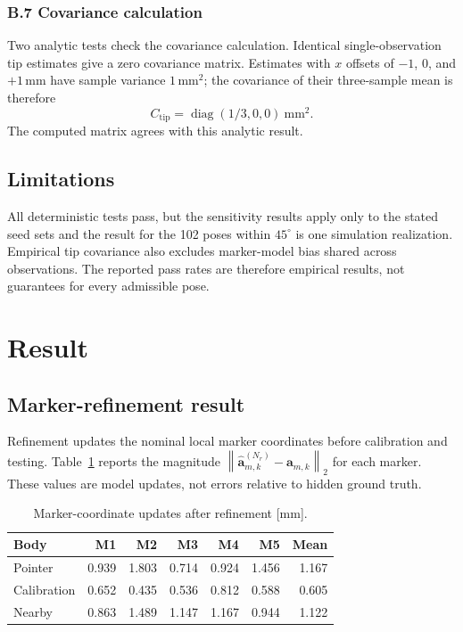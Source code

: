 \documentclass[11pt]{article}
\newcommand{\vct}[1]{\bm{#1}}
\newcommand{\diag}{\operatorname{diag}}
\newcommand{\norm}[1]{\left\|#1\right\|_2}
\begin{document}
\subsubsection*{B.7 Covariance calculation}
Two analytic tests check the covariance calculation.  Identical
single-observation tip estimates give a zero covariance matrix.  Estimates
with $x$ offsets of $-1$, 0, and $+1\,\mathrm{mm}$ have sample variance
$1\,\mathrm{mm}^2$; the covariance of their three-sample mean is therefore
\begin{equation}
C_{\mathrm{tip}}=\diag(1/3,0,0)\ \mathrm{mm}^2.
\end{equation}
The computed matrix agrees with this analytic result.

\subsection{Limitations}
All deterministic tests pass, but the sensitivity results apply only to the
stated seed sets and the result for the 102 poses within $45^\circ$ is one simulation
realization.  Empirical tip covariance also excludes marker-model bias shared
across observations.  The reported pass rates are therefore empirical results,
not guarantees for every admissible pose.

\section{Result}
\subsection{Marker-refinement result}
Refinement updates the nominal local marker coordinates before calibration and
testing.  Table~\ref{tab:result-refinement} reports the magnitude
$\norm{\widehat{\vct a}_{m,k}^{(N_r)}-\vct a_{m,k}}$ for each marker.  These
values are model updates, not errors relative to hidden ground truth.

\begin{table}[H]
\centering
\small
\caption{Marker-coordinate updates after refinement [mm].}
\label{tab:result-refinement}
\begin{tabular}{lrrrrrr}
\toprule
Body & M1 & M2 & M3 & M4 & M5 & Mean \\
\midrule
Pointer & 0.939 & 1.803 & 0.714 & 0.924 & 1.456 & 1.167 \\
Calibration & 0.652 & 0.435 & 0.536 & 0.812 & 0.588 & 0.605 \\
Nearby & 0.863 & 1.489 & 1.147 & 1.167 & 0.944 & 1.122 \\
\bottomrule
\end{tabular}
\end{table}
\end{document}
